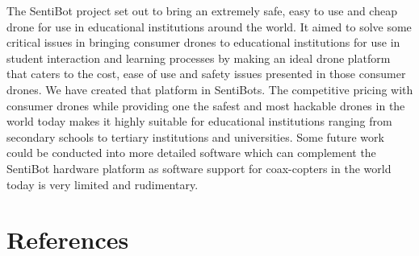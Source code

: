 \documentclass[12pt]{article}
\begin{document}
The SentiBot project set out to bring an extremely safe, easy to use and cheap drone for use in educational institutions around the world. It aimed to solve some critical issues in bringing consumer drones to educational institutions for use in student interaction and learning processes by making an ideal drone platform that caters to the cost, ease of use and safety issues presented in those consumer drones. We have created that platform in SentiBots. The competitive pricing with consumer drones while providing one the safest and most hackable drones in the world today makes it highly suitable for educational institutions ranging from secondary schools to tertiary institutions and universities. 
Some future work could be conducted into more detailed software which can complement the SentiBot hardware platform as software support for coax-copters in the world today is very limited and rudimentary.

\section{References}



\end{document}

